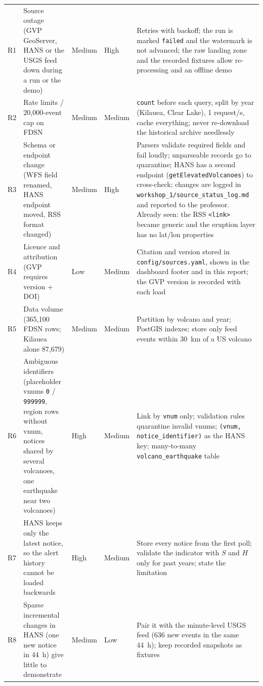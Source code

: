 \documentclass[11pt,a4paper]{article}
\begin{document}
\begin{longtable}{@{}L{0.7cm}L{3.4cm}L{1.6cm}L{1.3cm}L{7.5cm}@{}}
R1 & Source outage (GVP GeoServer, HANS or the USGS feed down during a run or the
demo) & Medium & High &
Retries with backoff; the run is marked \texttt{failed} and the watermark is not
advanced; the raw landing zone and the recorded fixtures allow re-processing and an
offline demo \\
\addlinespace
R2 & Rate limits / 20{,}000-event cap on FDSN & Medium & Medium &
\texttt{count} before each query, split by year (Kilauea, Clear Lake), 1 request/s,
cache everything; never re-download the historical archive needlessly \\
\addlinespace
R3 & Schema or endpoint change (WFS field renamed, HANS endpoint moved, RSS format
changed) & Medium & High &
Parsers validate required fields and fail loudly; unparseable records go to
quarantine; HANS has a second endpoint (\texttt{getElevatedVolcanoes}) to cross-check;
changes are logged in \texttt{workshop\_1/source\_status\_log.md} and reported to the
professor. Already seen: the RSS \texttt{<link>} became generic and the eruption layer
has no lat/lon properties \\
\addlinespace
R4 & Licence and attribution (GVP requires version + DOI) & Low & Medium &
Citation and version stored in \texttt{config/sources.yaml}, shown in the dashboard
footer and in this report; the GVP version is recorded with each load \\
\addlinespace
R5 & Data volume (365{,}100 FDSN rows; Kilauea alone 87{,}679) & Medium & Medium &
Partition by volcano and year; PostGIS indexes; store only feed events within 30~km of
a US volcano \\
\addlinespace
R6 & Ambiguous identifiers (placeholder vnums \texttt{0} / \texttt{999999}, region rows
without vnum, notices shared by several volcanoes, one earthquake near two volcanoes) &
High & Medium &
Link by \texttt{vnum} only; validation rules quarantine invalid vnums;
\texttt{(vnum, notice\_identifier)} as the HANS key; many-to-many
\texttt{volcano\_earthquake} table \\
\addlinespace
R7 & HANS keeps only the latest notice, so the alert history cannot be loaded backwards
& High & Medium &
Store every notice from the first poll; validate the indicator with $S$ and $H$ only
for past years; state the limitation \\
\addlinespace
R8 & Sparse incremental changes in HANS (one new notice in 44~h) give little to
demonstrate & Medium & Low &
Pair it with the minute-level USGS feed (636 new events in the same 44~h); keep
recorded snapshots as fixtures \\

\end{longtable}
\end{document}
